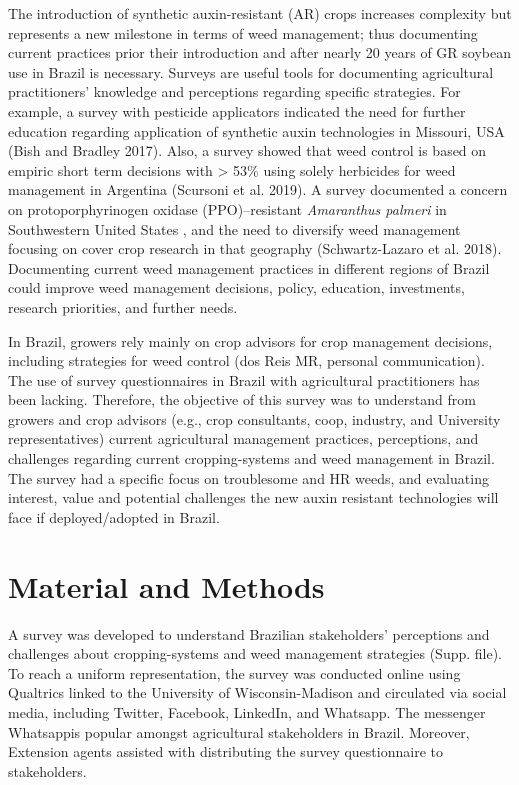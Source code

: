 \documentclass[
  12pt,
  a4paper]{article}
\begin{document}
The introduction of synthetic auxin-resistant (AR) crops increases
complexity but represents a new milestone in terms of weed management;
thus documenting current practices prior their introduction and after
nearly 20 years of GR soybean use in Brazil is necessary. Surveys are
useful tools for documenting agricultural practitioners' knowledge and
perceptions regarding specific strategies. For example, a survey with
pesticide applicators indicated the need for further education regarding
application of synthetic auxin technologies in Missouri, USA (Bish and
Bradley 2017). Also, a survey showed that weed control is based on
empiric short term decisions with \textgreater{} 53\% using solely
herbicides for weed management in Argentina (Scursoni et al. 2019). A
survey documented a concern on protoporphyrinogen oxidase
(PPO)--resistant \emph{Amaranthus palmeri} in Southwestern United States
, and the need to diversify weed management focusing on cover crop
research in that geography (Schwartz-Lazaro et al. 2018). Documenting
current weed management practices in different regions of Brazil could
improve weed management decisions, policy, education, investments,
research priorities, and further needs.

In Brazil, growers rely mainly on crop advisors for crop management
decisions, including strategies for weed control (dos Reis MR, personal
communication). The use of survey questionnaires in Brazil with
agricultural practitioners has been lacking. Therefore, the objective of
this survey was to understand from growers and crop advisors (e.g., crop
consultants, coop, industry, and University representatives) current
agricultural management practices, perceptions, and challenges regarding
current cropping-systems and weed management in Brazil. The survey had a
specific focus on troublesome and HR weeds, and evaluating interest,
value and potential challenges the new auxin resistant technologies will
face if deployed/adopted in Brazil.

\hypertarget{material-and-methods}{%
\section{Material and Methods}\label{material-and-methods}}

A survey was developed to understand Brazilian stakeholders' perceptions
and challenges about cropping-systems and weed management strategies
(Supp. file). To reach a uniform representation, the survey was
conducted online using Qualtrics linked to the University of
Wisconsin-Madison and circulated via social media, including
Twitter\textsuperscript \textregistered,
Facebook\textsuperscript \textregistered,
LinkedIn\textsuperscript \textregistered, and
Whatsapp\textsuperscript \textregistered. The messenger
Whatsapp\textsuperscript \textregistered is popular amongst agricultural
stakeholders in Brazil. Moreover, Extension agents assisted with
distributing the survey questionnaire to stakeholders.
\end{document}
